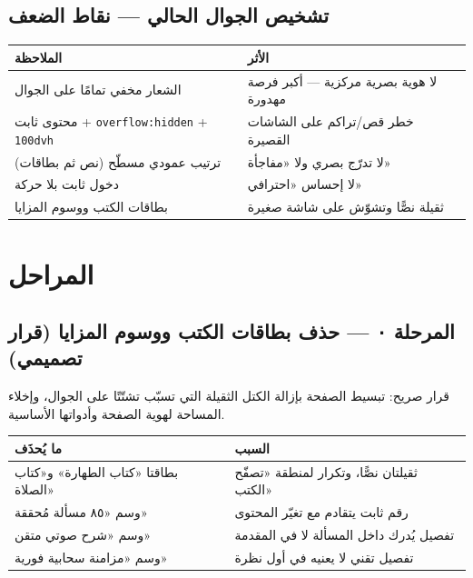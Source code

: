 \documentclass[11pt]{article}
\newcommand{\code}[1]{\textcolor{darkbg}{\texttt{\small #1}}}
\begin{document}
\subsection*{تشخيص الجوال الحالي — نقاط الضعف}
\begin{center}
\renewcommand{\arraystretch}{1.35}
\begin{tabular}{@{}p{6cm} p{8cm}@{}}
\toprule
\textbf{الملاحظة} & \textbf{الأثر} \\
\midrule
الشعار مخفي تمامًا على الجوال & لا هوية بصرية مركزية — أكبر فرصة مهدورة \\
محتوى ثابت + \code{overflow:hidden} + \code{100dvh} & خطر قص/تراكم على الشاشات القصيرة \\
ترتيب عمودي مسطّح (نص ثم بطاقات) & لا تدرّج بصري ولا «مفاجأة» \\
دخول ثابت بلا حركة & لا إحساس «احترافي» \\
بطاقات الكتب ووسوم المزايا & ثقيلة نصًّا وتشوّش على شاشة صغيرة \\
\bottomrule
\end{tabular}
\end{center}

\section{المراحل}

\subsection{المرحلة ٠ — حذف بطاقات الكتب ووسوم المزايا (قرار تصميمي)}
قرار صريح: تبسيط الصفحة بإزالة الكتل الثقيلة التي تسبّب تشتّتًا على الجوال، وإخلاء المساحة لهوية الصفحة وأدواتها الأساسية.

\begin{center}
\renewcommand{\arraystretch}{1.3}
\begin{tabular}{@{}p{6cm} p{8cm}@{}}
\toprule
\textbf{ما يُحذَف} & \textbf{السبب} \\
\midrule
بطاقتا «كتاب الطهارة» و«كتاب الصلاة» & ثقيلتان نصًّا، وتكرار لمنطقة «تصفّح الكتب» \\
وسم «٨٥ مسألة مُحققة» & رقم ثابت يتقادم مع تغيّر المحتوى \\
وسم «شرح صوتي متقن» & تفصيل يُدرك داخل المسألة لا في المقدمة \\
وسم «مزامنة سحابية فورية» & تفصيل تقني لا يعنيه في أول نظرة \\
\bottomrule
\end{tabular}
\end{center}
\end{document}
